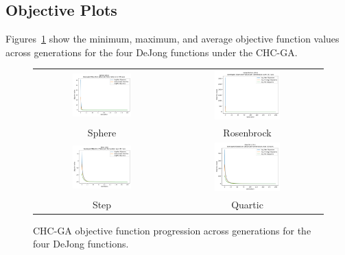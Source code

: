 \documentclass[11pt]{article}
\begin{document}
\subsection{Objective Plots}
Figures~\ref{fig:chc-objective} show the minimum, maximum, and average objective function values across generations for the four DeJong functions under the CHC-GA.

\begin{figure}[H]
    \centering
    \begin{tabular}{cc}
        \includegraphics[width=0.45\textwidth]{plots/sphere_chc_objective.png} &
        \includegraphics[width=0.45\textwidth]{plots/rosenbrock_chc_objective.png} \\
        Sphere & Rosenbrock \\
        \includegraphics[width=0.45\textwidth]{plots/step_chc_objective.png} &
        \includegraphics[width=0.45\textwidth]{plots/quartic_chc_objective.png} \\
        Step & Quartic \\
    \end{tabular}
    \caption{CHC-GA objective function progression across generations for the four DeJong functions.}
    \label{fig:chc-objective}
\end{figure}
\clearpage
\end{document}

